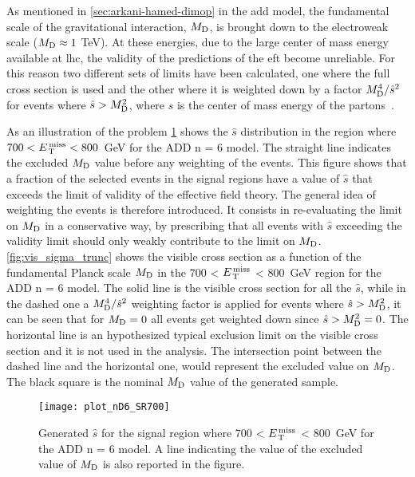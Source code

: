 As mentioned in \cref{sec:arkani-hamed-dimop} in the \gls{add} model, the
fundamental scale of the gravitational interaction, $M_\mathrm{D}$, is brought down to
the electroweak scale ($M_\mathrm{D} \approx 1~$TeV). At these energies, due to the large
center of mass energy available at \gls{lhc}, the validity of the predictions of
the \gls{eft} become unreliable. For this reason two different sets of limits
have been calculated, one where the full cross section is used and the other
where it is weighted down by a factor $M_\mathrm{D}^4/\hat{s}^2$ for events where
$\hat{s} > M_\mathrm{D}^2$, where $\hat{s}$ is the center of mass energy of the
partons~\cite{LEDWeightFactor}.


As an illustration of the problem \cref{fig:shat} shows the $\hat{s}$
distribution in the region where $700 < E_\mathrm{\, T}^\mathrm{\, miss} < 800$~GeV for the ADD n = 6
model. The straight line indicates the excluded $M_\mathrm{D}$ value before any weighting
of the events. This figure shows that a fraction of the selected events in the
signal regions have a value of $\hat{s}$ that exceeds the limit of validity of
the effective field theory. The general idea of weighting the events is
therefore introduced. It consists in re-evaluating the limit on $M_\mathrm{D}$ in a
conservative way, by prescribing that all events with $\hat{s}$ exceeding the
validity limit should only weakly contribute to the limit on $M_\mathrm{D}$.
\cref{fig:vis_sigma_trunc} shows the visible cross section as a
function of the fundamental Planck scale $M_\mathrm{D}$ in the 700 < $E_\mathrm{\, T}^\mathrm{\, miss}$ < 800~GeV
region for the ADD n = 6 model. The solid line is the visible cross section for
all the $\hat{s}$, while in the dashed one a $M_\mathrm{D}^4/\hat{s}^2$ weighting factor
is applied for events where $\hat{s} > M_\mathrm{D}^2$, it can be seen that for $M_\mathrm{D} = 0$
all events get weighted down since $\hat{s} > M_\mathrm{D}^2 = 0$. The horizontal line is
an hypothesized typical exclusion limit on the visible cross section and it is
not used in the analysis. The intersection point between the dashed line and the
horizontal one, would represent the excluded value on $M_\mathrm{D}$. The black square is
the nominal $M_\mathrm{D}$ value of the generated sample.

\begin{figure}[!h]
  \centering
  \texttt{[image: plot\_nD6\_SR700]}
  \caption{Generated $\hat{s}$ for the signal region where 700 < $E_\mathrm{\, T}^\mathrm{\, miss}$ <
    800~GeV for the ADD n = 6 model. A line indicating the value of the excluded
    value of $M_\mathrm{D}$ is also reported in the figure.}
  \label{fig:shat}
\end{figure}

